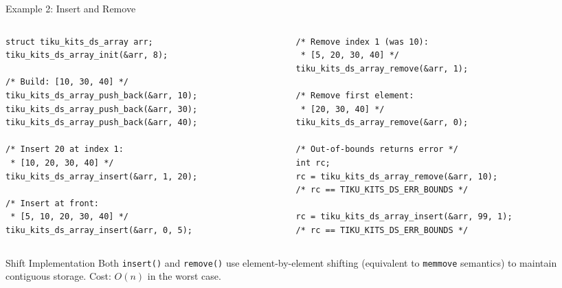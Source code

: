 \documentclass[aspectratio=169, 10pt]{beamer}
\begin{document}
\begin{frame}[fragile]{Example 2: Insert and Remove}
\begin{columns}[T]
\begin{column}{0.48\textwidth}
\begin{lstlisting}[style=cstyle,
  title={Insert shifts elements right}]
struct tiku_kits_ds_array arr;
tiku_kits_ds_array_init(&arr, 8);

/* Build: [10, 30, 40] */
tiku_kits_ds_array_push_back(&arr, 10);
tiku_kits_ds_array_push_back(&arr, 30);
tiku_kits_ds_array_push_back(&arr, 40);

/* Insert 20 at index 1:
 * [10, 20, 30, 40] */
tiku_kits_ds_array_insert(&arr, 1, 20);

/* Insert at front:
 * [5, 10, 20, 30, 40] */
tiku_kits_ds_array_insert(&arr, 0, 5);
\end{lstlisting}
\end{column}

\begin{column}{0.48\textwidth}
\begin{lstlisting}[style=cstyle,
  title={Remove shifts elements left}]
/* Remove index 1 (was 10):
 * [5, 20, 30, 40] */
tiku_kits_ds_array_remove(&arr, 1);

/* Remove first element:
 * [20, 30, 40] */
tiku_kits_ds_array_remove(&arr, 0);

/* Out-of-bounds returns error */
int rc;
rc = tiku_kits_ds_array_remove(&arr, 10);
/* rc == TIKU_KITS_DS_ERR_BOUNDS */

rc = tiku_kits_ds_array_insert(&arr, 99, 1);
/* rc == TIKU_KITS_DS_ERR_BOUNDS */
\end{lstlisting}
\end{column}
\end{columns}

\vspace{0.3em}
\begin{block}{Shift Implementation}
Both \texttt{insert()} and \texttt{remove()} use element-by-element shifting
(equivalent to \texttt{memmove} semantics) to maintain contiguous storage.
Cost: $O(n)$ in the worst case.
\end{block}
\end{frame}
\end{document}

